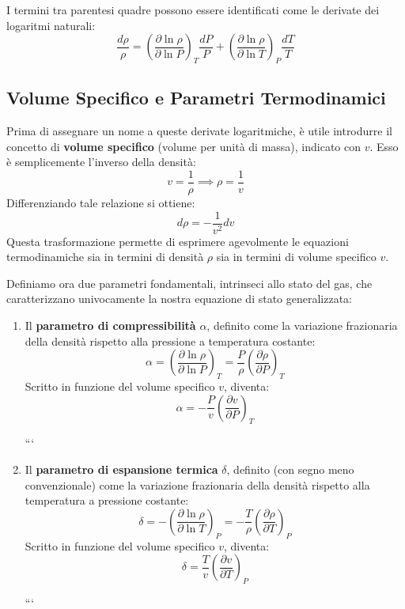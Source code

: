 I termini tra parentesi quadre possono essere identificati come le derivate dei logaritmi naturali:
\begin{equation}
\frac{d\rho}{\rho} = \left( \frac{\partial \ln \rho}{\partial \ln P} \right)_T \frac{dP}{P} + \left( \frac{\partial \ln \rho}{\partial \ln T} \right)_P \frac{dT}{T}
\end{equation}

\subsection{Volume Specifico e Parametri Termodinamici}

Prima di assegnare un nome a queste derivate logaritmiche, è utile introdurre il concetto di \textbf{volume specifico} (volume per unità di massa), indicato con $v$. Esso è semplicemente l'inverso della densità:
\begin{equation}
v = \frac{1}{\rho} \implies \rho = \frac{1}{v}
\end{equation}
Differenziando tale relazione si ottiene:
\begin{equation}
d\rho = - \frac{1}{v^2} dv
\end{equation}
Questa trasformazione permette di esprimere agevolmente le equazioni termodinamiche sia in termini di densità $\rho$ sia in termini di volume specifico $v$.

Definiamo ora due parametri fondamentali, intrinseci allo stato del gas, che caratterizzano univocamente la nostra equazione di stato generalizzata:
\begin{enumerate}
\item Il \textbf{parametro di compressibilità} $\alpha$, definito come la variazione frazionaria della densità rispetto alla pressione a temperatura costante:
\begin{equation}
\alpha = \left( \frac{\partial \ln \rho}{\partial \ln P} \right)_T = \frac{P}{\rho} \left(\frac{\partial \rho}{\partial P}\right)_T
\end{equation}
Scritto in funzione del volume specifico $v$, diventa:
\begin{equation}
\alpha = - \frac{P}{v} \left(\frac{\partial v}{\partial P}\right)_T
\end{equation}

```
\item Il \textbf{parametro di espansione termica} $\delta$, definito (con segno meno convenzionale) come la variazione frazionaria della densità rispetto alla temperatura a pressione costante:
\begin{equation}
    \delta = - \left( \frac{\partial \ln \rho}{\partial \ln T} \right)_P = - \frac{T}{\rho} \left(\frac{\partial \rho}{\partial T}\right)_P
\end{equation}
Scritto in funzione del volume specifico $v$, diventa:
\begin{equation}
    \delta = \frac{T}{v} \left(\frac{\partial v}{\partial T}\right)_P
\end{equation}

```

\end{enumerate}

